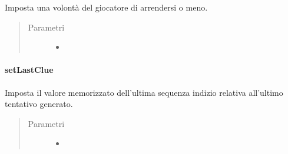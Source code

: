 \documentclass[letterpaper,10pt,italian,openany,oneside]{sphinxmanual}
\begin{document}
\begin{fulllineitems}
\label{\detokenize{source/it/unicam/cs/pa/mastermind/players/CodeBreaker:it.unicam.cs.pa.mastermind.players.CodeBreaker.setGiveUp(boolean)}}
Imposta una volontà del giocatore di arrendersi o meno.
\begin{quote}\begin{description}
\item[{Parametri}] \leavevmode\begin{itemize}
\item {} 
 \textendash{} 

\end{itemize}

\end{description}\end{quote}

\end{fulllineitems}



\paragraph{setLastClue}
\label{\detokenize{source/it/unicam/cs/pa/mastermind/players/CodeBreaker:setlastclue}}

\begin{fulllineitems}
\label{\detokenize{source/it/unicam/cs/pa/mastermind/players/CodeBreaker:it.unicam.cs.pa.mastermind.players.CodeBreaker.setLastClue(List)}}
Imposta il valore memorizzato dell’ultima sequenza indizio relativa all’ultimo tentativo generato.
\begin{quote}\begin{description}
\item[{Parametri}] \leavevmode\begin{itemize}
\item {} 
 \textendash{} 

\end{itemize}

\end{description}\end{quote}

\end{fulllineitems}
\end{document}
